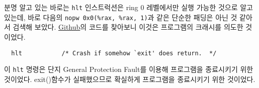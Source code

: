 \documentclass{report}
\begin{document}
분명 알고 있는 바로는 \lstinline{hlt} 인스트럭션은 ring 0 레벨에서만 실행 가능한 것으로 알고 있는데, 바로 다음의 \lstinline{nopw 0x0(%rax, %rax, 1)}과 같은 단순한 패딩은 아닌 것 같아서 검색해 보았다. \href{https://github.com/bminor/glibc/blob/2a69f853c03034c2e383e0f9c35b5402ce8b5473/sysdeps/i386/start.S#L118}{Github}의 코드를 찾아보니 이것은 프로그램의 크래시를 의도한 것이었다.
\begin{verbatim}
  hlt			/* Crash if somehow `exit' does return.  */
\end{verbatim}
이 \lstinline{hlt} 명령은 단지 General Protection Fault를 이용해 프로그램을 종료시키기 위한 것이었다. exit()함수가 실패했으므로 확실하게 프로그램을 종료시키기 위한 것이었다.
\end{document}
